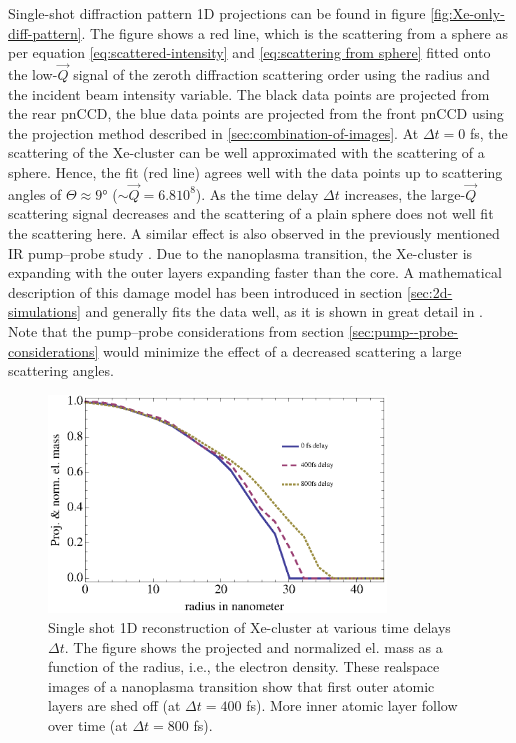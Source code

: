 Single-shot diffraction pattern 1D projections can be found in figure \ref{fig:Xe-only-diff-pattern}. The figure shows a red line, which is the scattering from a sphere as per equation \eqref{eq:scattered-intensity} and \eqref{eq:scattering from sphere} fitted onto the low-$\vec{Q}$ signal of the zeroth diffraction scattering order using the radius and the incident beam intensity variable. The black data points are projected from the rear pnCCD, the blue data points are projected from the front pnCCD using the projection method described in \ref{sec:combination-of-images}. At $\Delta t=0$ fs, the scattering of the Xe-cluster can be well approximated with the scattering of a sphere. Hence, the fit (red line) agrees well with the data points up to scattering angles of $\Theta \approx 9$° ($\sim \vec{Q}=6.8 10^{8}$). As the time delay $\Delta t$ increases, the large-$\vec{Q}$ scattering signal decreases and the scattering of a plain sphere does not well fit the scattering here. A similar effect is also observed in the previously mentioned IR pump--probe study \citep{Gorkhover-2016-NatPho}. Due to the nanoplasma transition, the Xe-cluster is expanding with the outer layers expanding faster than the core. A mathematical description of this damage model has been introduced in section \ref{sec:2d-simulations} and generally fits the data well, as it is shown in great detail in \citep{Gorkhover-2016-NatPho,Gorkhover-2014-Thesis}. Note that the pump--probe considerations from section \ref{sec:pump--probe-considerations} would minimize the effect of a decreased scattering a large scattering angles.\\
\begin{figure}
	\centering
		\includegraphics[width=0.80\textwidth]{images/results/Xe-reconstructions.eps}
	\caption[Single-shot 1D reconstruction of $\sim 30$ nm radius Xe-cluster]{Single shot 1D reconstruction of Xe-cluster at various time delays $\Delta t$. The figure shows the projected and normalized el. mass as a function of the radius, i.e., the electron density. These realspace images of a nanoplasma transition show that first outer atomic layers are shed off (at $\Delta t=400$ fs). More inner atomic layer follow over time (at $\Delta t= 800$ fs).}
	\label{fig:Xe-reconstructions}
\end{figure}

